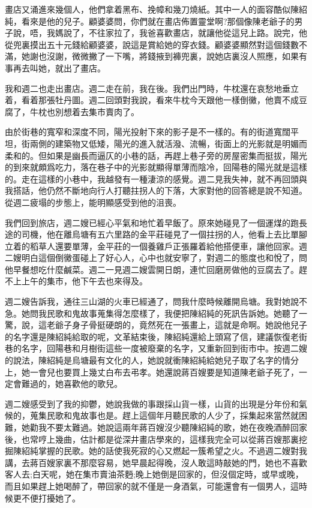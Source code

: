\documentclass[a6paper]{article}
\begin{document}
畫店又涌進來幾個人，他們拿着黑布、挽幛和幾刀燒紙。其中一人的面容酷似陳紹純，看來是他的兒子。顧婆婆問，你們就在畫店佈置靈堂啊?那個像陳老爺子的男子說，唔，我媽說了，不往家拉了，我爸喜歡畫店，就讓他從這兒上路。說完，他從兜裏摸出五十元錢給顧婆婆，說這是賞給她的穿衣錢。顧婆婆顯然對這個錢數不滿，她謝也沒謝，微微撇了一下嘴，將錢掖到褲兜裏，說她店裏沒人照應，如果有事再去叫她，就出了畫店。

我和週二也走出畫店。週二走在前，我在後。我們出門時，牛枕還在哀愁地垂立着，看着那張牡丹圖。週二回頭對我說，看來牛枕今天跟他一樣倒黴，他賣不成豆腐了，牛枕也別想着去集市賣肉了。

由於街巷的寬窄和深度不同，陽光投射下來的影子是不一樣的。有的街道寬闊平坦，街兩側的建築物又低矮，陽光的進入就活潑、流暢，街面上的光影就是明媚而柔和的。但如果是幽長而逼仄的小巷的話，再趕上巷子旁的房屋密集而挺拔，陽光的到來就頗爲吃力，落在巷子中的光影就顯得單薄而陰冷，回陽巷的陽光就是這樣的。走在這樣的小巷中，我越發有一種淒涼的感覺。週二見我失神，就不再回頭與我搭話，他仍然不斷地向行人打聽拄拐人的下落，大家對他的回答總是說不知道。從週二疲塌的步態上，能明顯感受到他的沮喪。

我們回到旅店，週二嫂已經心平氣和地忙着早飯了。原來她碰見了一個運煤的跑長途的司機，他在離烏塘有五六里路的金平莊碰見了一個拄拐的人，他看上去比單腳立着的稻草人還要單薄，金平莊的一個養雞戶正張羅着給他搭便車，讓他回家。週二嫂明白這個倒黴蛋碰上了好心人，心中也就安寧了，對週二的態度也和悅了，問他早餐想吃什麼鹹菜。週二一見週二嫂雲開日朗，連忙回磨房做他的豆腐去了。趕不上上午的集市，他下午去也來得及。

週二嫂告訴我，通往三山湖的火車已經通了，問我什麼時候離開烏塘。我對她說不急。她問我民歌和鬼故事蒐集得怎麼樣了，我便把陳紹純的死訊告訴她。她聽了一驚，說，這老爺子身子骨挺硬朗的，竟然死在一張畫上，這就是命啊。她說他兒子的名字還是陳紹純給取的呢，文革結束後，陳紹純還給上頭寫了信，建議恢復老街巷的名字，回陽巷和月樹街這些一度被廢棄的名字，又重新回到街市中。按週二嫂的說法，陳紹純是烏塘最有文化的人，她說就衝陳紹純給她兒子取了名字的情分上，她一會兒也要買上幾丈白布去弔孝。她還說蔣百嫂要是知道陳老爺子死了，一定會難過的，她喜歡他的歌兒。

週二嫂感受到了我的抑鬱，她說我做的事跟採山貨一樣，山貨的出現是分年份和氣候的，蒐集民歌和鬼故事也是。趕上這個年月聽民歌的人少了，採集起來當然就困難，她勸我不要太難過。她說這兩年蔣百嫂沒少聽陳紹純的歌，她在夜晚酒醉回家後，也常哼上幾曲，估計都是從深井畫店學來的，這樣我完全可以從蔣百嫂那裏挖掘陳紹純掌握的民歌。她的話使我死寂的心又燃起一簇希望之火。不過週二嫂對我講，去蔣百嫂家裏不那麼容易，她早晨起得晚，沒人敢這時敲她的門，她也不喜歡客人去;白天呢，她在集市賣油茶麪;晚上她倒是回家的，但沒個定時，或早或晚，而且如果趕上她喝醉了，帶回家的就不僅是一身酒氣，可能還會有一個男人，這時候更不便打擾她了。
\end{document}
